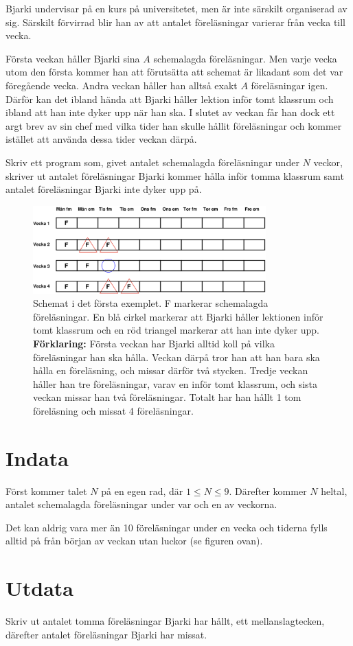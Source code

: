 

Bjarki undervisar på en kurs på universitetet, men är
inte särskilt organiserad av sig. Särskilt förvirrad blir han av att antalet föreläsningar
varierar från vecka till vecka.

Första veckan håller Bjarki sina $A$ schemalagda föreläsningar. Men varje vecka utom den första kommer han att förutsätta att schemat är likadant som det var föregående vecka. Andra veckan håller han alltså exakt $A$ föreläsningar igen. Därför
kan det ibland hända att Bjarki håller lektion inför tomt klassrum och ibland att han inte dyker upp när han ska. I slutet av veckan får han dock ett argt brev av sin chef med vilka tider han skulle hållit
föreläsningar och kommer istället att använda dessa tider veckan därpå. 

Skriv ett program som, givet antalet schemalagda föreläsningar under $N$ veckor, skriver ut antalet
föreläsningar Bjarki kommer hålla inför tomma klassrum samt antalet
föreläsningar Bjarki inte dyker upp på.

\begin{figure}[ht!]
\centering
\includegraphics[width=0.8\textwidth]{forelasare.png}
\caption{Schemat i det första exemplet. F markerar schemalagda föreläsningar. En blå cirkel markerar att Bjarki håller lektionen inför tomt klassrum och en röd triangel markerar att han inte dyker upp. {\bf Förklaring:} Första veckan har Bjarki alltid koll på vilka
föreläsningar han ska hålla. Veckan därpå tror han att han bara ska
hålla en föreläsning, och missar därför två stycken. Tredje veckan håller han
tre föreläsningar, varav en inför tomt klassrum, och sista veckan missar han två
föreläsningar. Totalt har han hållt 1 tom föreläsning och missat 4 föreläsningar.} 
\label{overflow}
\end{figure}


\section*{Indata}

Först kommer talet $N$ på en egen rad, där $1\le N \le 9$. Därefter kommer $N$ heltal, antalet
schemalagda föreläsningar under var och en av veckorna.

Det kan aldrig vara mer än 10 föreläsningar under en vecka och tiderna fylls alltid på från början av veckan utan luckor (se figuren ovan). 

\section*{Utdata}
Skriv ut antalet tomma föreläsningar Bjarki har hållt, ett mellanslagtecken,
därefter antalet föreläsningar Bjarki har missat.

